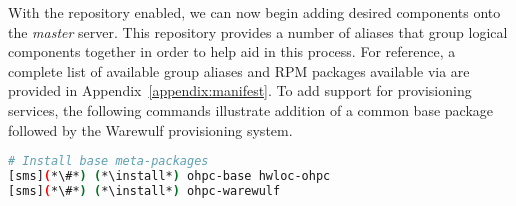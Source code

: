 With the \OHPC{} repository enabled, we can now begin adding desired components onto the
{\em master} server. This repository provides a number of aliases that group
logical components together in order to help aid in this process. For
reference, a complete list of available group aliases and RPM packages available
via \OHPC{} are provided in Appendix~\ref{appendix:manifest}. To add
support for provisioning services, the following commands illustrate addition
of a common base package followed by the Warewulf provisioning system.


\begin{lstlisting}[language=bash,keywords={}]
# Install base meta-packages
[sms](*\#*) (*\install*) ohpc-base hwloc-ohpc
[sms](*\#*) (*\install*) ohpc-warewulf
\end{lstlisting}


